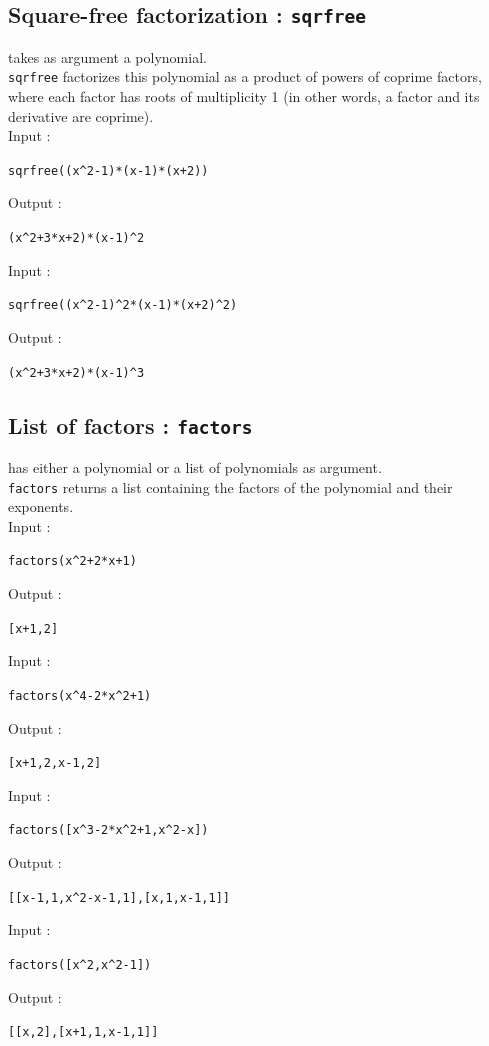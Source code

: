 \documentclass[a4paper,11pt]{book}
\begin{document}
\subsection{Square-free factorization : {\tt sqrfree}}
 takes as argument a polynomial.\\
{\tt sqrfree} factorizes this polynomial as a product of
powers of coprime factors, where each factor has roots of multiplicity 1
(in other words, a factor and its derivative are coprime).\\
Input : 
\begin{center}{\tt sqrfree((x\verb|^|2-1)*(x-1)*(x+2))}\end{center} 
Output :
 \begin{center}{\tt (x\verb|^|2+3*x+2)*(x-1)\verb|^|2}\end{center} 
Input : 
\begin{center}{\tt sqrfree((x\verb|^|2-1)\verb|^|2*(x-1)*(x+2)\verb|^|2)}\end{center} 
Output :
 \begin{center}{\tt (x\verb|^|2+3*x+2)*(x-1)\verb|^|3}\end{center} 

\subsection{List of factors : {\tt factors}}
  has either a polynomial or a list of polynomials as 
argument.\\
{\tt factors} returns a list containing the factors of the polynomial
and their exponents.\\
Input :
 \begin{center}{\tt factors(x\verb|^|2+2*x+1)}\end{center}
Output :
\begin{center}{\tt  [x+1,2]}\end{center}
Input :
 \begin{center}{\tt factors(x\verb|^|4-2*x\verb|^|2+1)}\end{center}
Output :
\begin{center}{\tt [x+1,2,x-1,2]}\end{center}
Input :
 \begin{center}{\tt factors([x\verb|^|3-2*x\verb|^|2+1,x\verb|^|2-x])}\end{center}
Output :
\begin{center}{\tt [[x-1,1,x\verb|^|2-x-1,1],[x,1,x-1,1]]}\end{center}
Input :
 \begin{center}{\tt factors([x\verb|^|2,x\verb|^|2-1])}\end{center}
Output :
\begin{center}{\tt  [[x,2],[x+1,1,x-1,1]]}\end{center}
\end{document}
